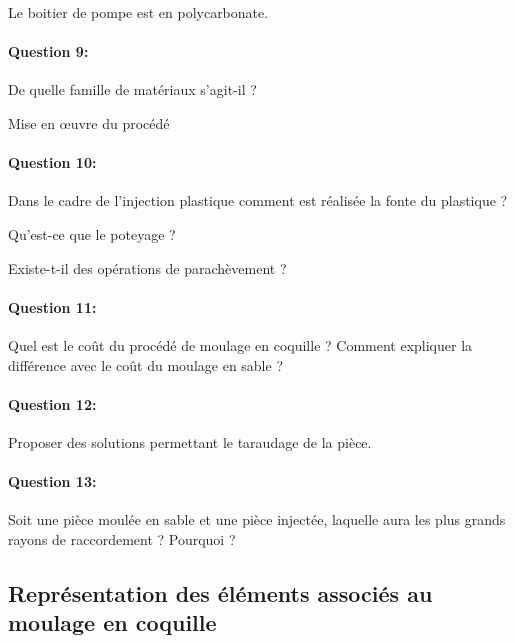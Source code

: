 Le boitier de pompe est en polycarbonate.

\paragraph{Question 9:} De quelle famille de matériaux s'agit-il ?

Mise en \oe uvre du procédé

\paragraph{Question 10:} Dans le cadre de l'injection plastique comment est réalisée la fonte du plastique ?

Qu'est-ce que le \og poteyage \fg ?

Existe-t-il des opérations de parachèvement ?

\paragraph{Question 11:} Quel est le coût du procédé de moulage en coquille ? Comment expliquer la différence avec le coût du moulage en sable ?

\paragraph{Question 12:} Proposer des solutions permettant le taraudage de la pièce.

\paragraph{Question 13:} Soit une pièce moulée en sable et une pièce injectée, laquelle aura les plus grands rayons de raccordement ? Pourquoi ?

\subsection{Représentation des éléments associés au moulage en coquille}

